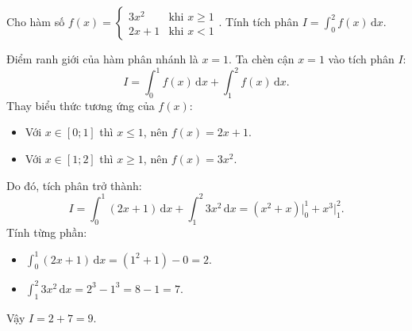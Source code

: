 \documentclass[12pt]{article}
\begin{document}
	\begin{vidu}
		Cho hàm số $f(x) = \begin{cases} 3x^2 & \text{khi } x \ge 1 \\ 2x + 1 & \text{khi } x < 1 \end{cases}$. Tính tích phân $I = \displaystyle \int_{0}^{2} f(x)\,\mathrm{d}x$.
	\end{vidu}
	\begin{loigiai}
		Điểm ranh giới của hàm phân nhánh là $x = 1$. Ta chèn cận $x = 1$ vào tích phân $I$:
		\[
		I = \int_{0}^{1} f(x)\,\mathrm{d}x + \int_{1}^{2} f(x)\,\mathrm{d}x.
		\]
		Thay biểu thức tương ứng của $f(x)$:
		\begin{itemize}
			\item Với $x \in [0; 1]$ thì $x \le 1$, nên $f(x) = 2x + 1$.
			\item Với $x \in [1; 2]$ thì $x \ge 1$, nên $f(x) = 3x^2$.
		\end{itemize}
		Do đó, tích phân trở thành:
		\[
		I = \int_{0}^{1} (2x + 1)\,\mathrm{d}x + \int_{1}^{2} 3x^2\,\mathrm{d}x = \left( x^2 + x \right) \Bigg|_0^1 + x^3 \Bigg|_1^2.
		\]
		Tính từng phần:
		\begin{itemize}
			\item $\displaystyle \int_{0}^{1} (2x + 1)\,\mathrm{d}x = (1^2 + 1) - 0 = 2$.
			\item $\displaystyle \int_{1}^{2} 3x^2\,\mathrm{d}x = 2^3 - 1^3 = 8 - 1 = 7$.
		\end{itemize}
		Vậy $I = 2 + 7 = 9$.
	\end{loigiai}
\end{document}
